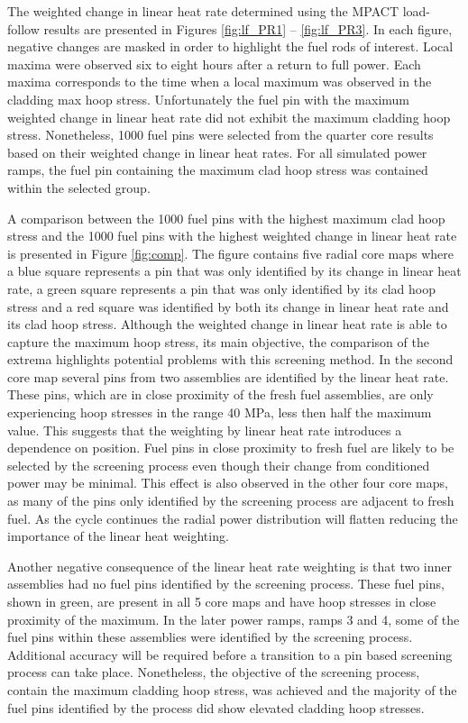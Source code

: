 \documentclass[edeposit,fullpage,11pt]{uiucthesis2009}
\begin{document}
The weighted change in linear heat rate determined using the MPACT load-follow results are presented in Figures \ref{fig:lf_PR1} -- \ref{fig:lf_PR3}.
In each figure, negative changes are masked in order to highlight the fuel rods of interest.
Local maxima were observed six to eight hours after a return to full power.
Each maxima corresponds to the time when a local maximum was observed in the cladding max hoop stress.
Unfortunately the fuel pin with the maximum weighted change in linear heat rate did not exhibit the maximum cladding hoop stress. 
Nonetheless, 1000 fuel pins were selected from the quarter core results based on their weighted change in linear heat rates.
For all simulated power ramps, the fuel pin containing the maximum clad hoop stress was contained within the selected group.
 
A comparison between the 1000 fuel pins with the highest maximum clad hoop stress and the 1000 fuel pins with the highest weighted change in linear heat rate is presented in Figure \ref{fig:comp}.
The figure contains five radial core maps where a blue square represents a pin that was only identified by its change in linear heat rate, a green square represents a pin that was only identified by its clad hoop stress and a red square was identified by both its change in linear heat rate and its clad hoop stress.
Although the weighted change in linear heat rate is able to capture the maximum hoop stress, its main objective, the comparison of the extrema highlights potential problems with this screening method.
In the second core map several pins from two assemblies are identified by the linear heat rate.
These pins, which are in close proximity of the fresh fuel assemblies, are only experiencing hoop stresses in the range 40 MPa, less then half the maximum value.
This suggests that the weighting by linear heat rate introduces a dependence on position.
Fuel pins in close proximity to fresh fuel are likely to be selected by the screening process even though their change from conditioned power may be minimal.
This effect is also observed in the other four core maps, as many of the pins only identified by the screening process are adjacent to fresh fuel.
As the cycle continues the radial power distribution will flatten reducing the importance of the linear heat weighting.

Another negative consequence of the linear heat rate weighting is that two inner assemblies had no fuel pins identified by the screening process.
These fuel pins, shown in green, are present in all 5 core maps and have hoop stresses in close proximity of the maximum.
In the later power ramps, ramps 3 and 4, some of the fuel pins within these assemblies were identified by the screening process.
Additional accuracy will be required before a transition to a pin based screening process can take place.
Nonetheless, the objective of the screening process, contain the maximum cladding hoop stress, was achieved and the majority of the fuel pins identified by the process did show elevated cladding hoop stresses.
\end{document}
